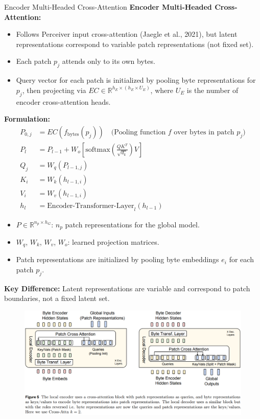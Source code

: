 \begin{frame}[allowframebreaks]{Encoder Multi-Headed Cross-Attention}
    \textbf{Encoder Multi-Headed Cross-Attention:}
    \begin{itemize}
        \item Follows Perceiver input cross-attention (Jaegle et al., 2021), but latent representations correspond to variable patch representations (not fixed set).
        \item Each patch $p_j$ attends only to its own bytes.
        \item Query vector for each patch is initialized by pooling byte representations for $p_j$, then projecting via $EC \in \mathbb{R}^{h_E \times (h_E \times U_E)}$, where $U_E$ is the number of encoder cross-attention heads.
    \end{itemize}
    \vspace{1em}
    \textbf{Formulation:}
    \begin{align}
        P_{0,j} &= EC(f_{\text{bytes}}(p_j)) \quad \text{(Pooling function $f$ over bytes in patch $p_j$)} \\
        P_l &= P_{l-1} + W_o \left[ \mathrm{softmax} \left( \frac{Q K^T}{\sqrt{d_k}} \right) V \right] \\
        Q_j &= W_q(P_{l-1,j}) \\
        K_i &= W_k(h_{l-1,i}) \\
        V_i &= W_v(h_{l-1,i}) \\
        h_l &= \text{Encoder-Transformer-Layer}_l(h_{l-1})
    \end{align}
    \vspace{1em}
    \begin{itemize}
        \item $P \in \mathbb{R}^{n_p \times h_G}$: $n_p$ patch representations for the global model.
        \item $W_q$, $W_k$, $W_v$, $W_o$: learned projection matrices.
        \item Patch representations are initialized by pooling byte embeddings $e_i$ for each patch $p_j$.
    \end{itemize}
    \vspace{1em}
    \textbf{Key Difference:} Latent representations are variable and correspond to patch boundaries, not a fixed latent set.
\framebreak
    \begin{figure}
        \centering
        \includegraphics[height=0.9\textheight,width=1.05\textwidth,keepaspectratio]{images/recent-advance/blt-cross-attention.png}
    \end{figure}
\end{frame}

